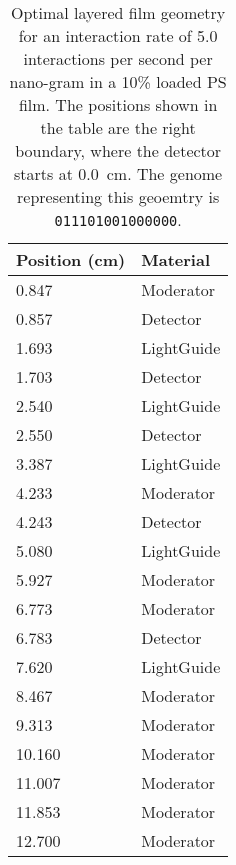 \begin{table}
	\caption[Optimal Layered Film Geometry for 5.0 interaction per second per nanogram Cf-252]{Optimal layered film geometry for an interaction rate of 5.0 interactions per second per nano-gram   in a 10\%  loaded PS film. The positions shown in the table are the right boundary, where the detector starts at \SI{0.0}{\cm}. The genome representing this geoemtry is \texttt{011101001000000}.}
	\label{tab:OptGeoDetailed5}
	\begin{tabular}{m{3cm} m{4cm}}
	\toprule
	Position (\si{\cm}) & Material \\
	\midrule
0.847&Moderator\\
0.857&Detector\\
1.693&LightGuide\\
1.703&Detector\\
2.540&LightGuide\\
2.550&Detector\\
3.387&LightGuide\\
4.233&Moderator\\
4.243&Detector\\
5.080&LightGuide\\
5.927&Moderator\\
6.773&Moderator\\
6.783&Detector\\
7.620&LightGuide\\
8.467&Moderator\\
9.313&Moderator\\
10.160&Moderator\\
11.007&Moderator\\
11.853&Moderator\\
12.700&Moderator\\
	\bottomrule
	\end{tabular}
\end{table}
